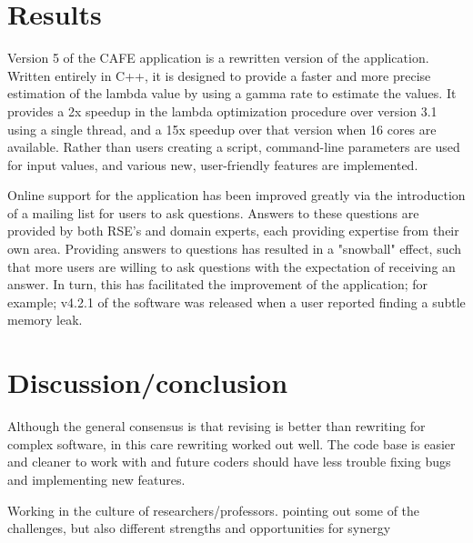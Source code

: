\documentclass[acmtog, authorversion]{acmart}
\begin{document}

  
\section{Results}
    Version 5 of the CAFE application is a rewritten version of the application. Written entirely in C++, it is designed to provide a faster and more precise estimation of the lambda value by using a gamma rate to estimate the values. It provides a 2x speedup in the lambda optimization procedure over version 3.1 using a single thread, and a 15x speedup over that version when 16 cores are available. Rather than users creating a script, command-line parameters are used for input values, and various new, user-friendly features are implemented.
    
    Online support for the application has been improved greatly via the introduction of a mailing list for users to ask questions. Answers to these questions are provided by both RSE's and domain experts, each providing expertise from their own area. Providing answers to questions has resulted in a "snowball" effect, such that more users are willing to ask questions with the expectation of receiving an answer. In turn, this has facilitated the improvement of the application; for example; v4.2.1 of the software was released when a user reported finding a subtle memory leak.
    
    

\section{Discussion/conclusion}

Although the general consensus is that revising is better than rewriting for complex software, in this care rewriting worked out well. The code base is easier and cleaner to work with and future coders should have less trouble fixing bugs and implementing new features.

Working in the culture of researchers/professors. pointing out some of the challenges, but also different strengths and opportunities for synergy
\end{document}
